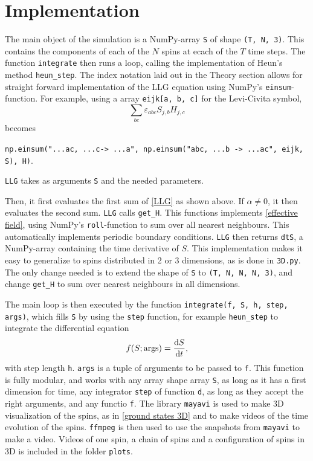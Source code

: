 \documentclass{article}
\begin{document}
    \section*{Implementation}
    The main object of the simulation is a NumPy-array \verb|S| of shape \verb|(T, N, 3)|.
    This contains the components of each of the $N$ spins at ecach of the $T$ time steps.
    The function \verb|integrate| then runs a loop, calling the implementation of Heun's method \verb|heun_step|.
    The index notation laid out in the Theory section allows for straight forward implementation of the LLG equation using NumPy's \verb|einsum|-function.
    For example, using a array \verb|eijk[a, b, c]| for the Levi-Civita symbol, 
    $$
    \sum_{b c}\varepsilon_{abc}S_{j, b}H_{j,c}
    $$
    becomes
    \begin{center}
        \verb|np.einsum("...ac, ...c-> ...a", np.einsum("abc, ...b -> ...ac", eijk, S), H)|.
    \end{center}
    \verb|LLG| takes as arguments \verb|S| and the needed parameters.
    
    Then, it first evaluates the first sum of \autoref{LLG} as shown above.
    If $\alpha \neq 0$, it then evaluates the second sum.
    \verb|LLG| calls \verb|get_H|.
    This functions implements \autoref{effective field}, using NumPy's \verb|roll|-function to sum over all nearest neighbours.
    This automatically implements periodic boundary conditions.
    \verb|LLG| then returns \verb|dtS|, a NumPy-array containing the time derivative of $S$.
    This implementation makes it easy to generalize to spins distributed in 2 or 3 dimensions, as is done in \verb|3D.py|.
    The only change needed is to extend the shape of \verb|S| to \verb|(T, N, N, N, 3)|, and change \verb|get_H| to sum over nearest neighbours in all dimensions.

    The main loop is then executed by the function \verb|integrate(f, S, h, step, args)|, which fills \verb|S| by using the \verb|step| function, for example \verb|heun_step| to integrate the differential equation
    \begin{equation*}
        f(S; \mathrm{args}) = \dv{S}{t},
    \end{equation*}
    with step length \verb|h|.
    \verb|args| is a tuple of arguments to be passed to \verb|f|.
    This function is fully modular, and works with any array shape array \verb|S|, as long as it has a first dimension for time, any integrator \verb|step| of function \verb|d|, as long as they accept the right arguments, and any functio \verb|f|.
    The library \verb|mayavi| is used to make 3D visualization of the spins, as in \autoref{ground states 3D} and to make videos of the time evolution of the spins.
    \verb|ffmpeg| is then used to use the snapshots from \verb|mayavi| to make a video.
    Videos of one spin, a chain of spins and a configuration of spins in 3D is included in the folder \verb|plots|.
\end{document}
